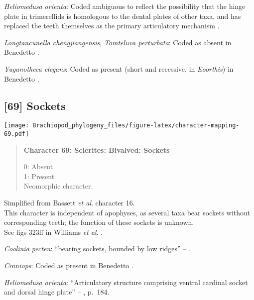 \documentclass[openany]{book}
\theoremstyle{definition}
\theoremstyle{definition}
\theoremstyle{definition}
\theoremstyle{remark}
\begin{document}
\hypertarget{Heliomedusa_orienta-coding-68}{}
\emph{Heliomedusa orienta}: Coded ambiguous to reflect the possibility
that the hinge plate in trimerellids is homologous to the dental plates
of other taxa, and has replaced the teeth themselves as the primary
articulatory mechanism \citep[see][p.~184, for details of the
articulation]{Williams2000LinguliformeaCraniiformea}.

\hypertarget{Longtancunella_chengjiangensis-coding-68}{}
\emph{Longtancunella chengjiangensis}, \emph{Tomteluva perturbata}:
Coded as absent in Benedetto \citeyearpar{Benedetto2009iChaniella}.

\hypertarget{Yuganotheca_elegans-coding-68}{}
\emph{Yuganotheca elegans}: Coded as present (short and recessive, in
\emph{Eoorthis}) in Benedetto \citeyearpar{Benedetto2009iChaniella}.

\subsection*{{[}69{]} Sockets}\label{sockets}

\texttt{[image: Brachiopod\_phylogeny\_files/figure-latex/character-mapping-69.pdf]}

\begin{quote}
\textbf{Character 69: Sclerites: Bivalved: Sockets}

0: Absent\\
1: Present\\
Neomorphic character.
\end{quote}

Simplified from Bassett \emph{et al}.
\citeyearpar{Bassett2001Functionalmorphology} character 16.\\
This character is independent of apophyses, as several taxa bear sockets
without corresponding teeth; the function of these sockets is unknown.\\
See figs 323ff in Williams \emph{et al}.
\citeyearpar{Williams1997Introduction}.

\hypertarget{Coolinia_pecten-coding-69}{}
\emph{Coolinia pecten}: ``bearing sockets, bounded by low ridges'' --
\citet{Williams2000LinguliformeaCraniiformea}.

\hypertarget{Craniops-coding-69}{}
\emph{Craniops}: Coded as present in Benedetto
\citeyearpar{Benedetto2009iChaniella}.

\hypertarget{Heliomedusa_orienta-coding-69}{}
\emph{Heliomedusa orienta}: ``Articulatory structure comprising ventral
cardinal socket and dorsal hinge plate'' --
\citet{Williams2000LinguliformeaCraniiformea}, p.~184.
\end{document}
